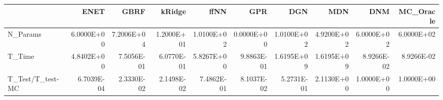 \begin{tabular}{lrrrrrrrrr}
\toprule
{} &       ENET &       GBRF &     kRidge &       ffNN &        GPR &        DGN &        MDN &        DNM &  MC\_Oracle \\
\midrule
N\_Params         & 6.0000E+00 & 7.2006E+04 & 1.2000E+01 & 1.0100E+02 & 0.0000E+00 & 1.0100E+02 & 4.9200E+02 & 6.0000E+02 & 6.0000E+02 \\
T\_Time           & 4.8402E+00 & 7.5056E-01 & 6.0770E-01 & 5.8267E+00 & 9.8863E-01 & 1.6195E+09 & 1.6195E+09 & 8.9266E-02 & 8.9266E-02 \\
T\_Test/T\_test-MC & 6.7039E-04 & 2.3330E-02 & 2.1498E-02 & 7.4862E-01 & 8.1037E-02 & 5.2731E-01 & 2.1130E+00 & 1.0000E+00 & 1.0000E+00 \\
\bottomrule
\end{tabular}
